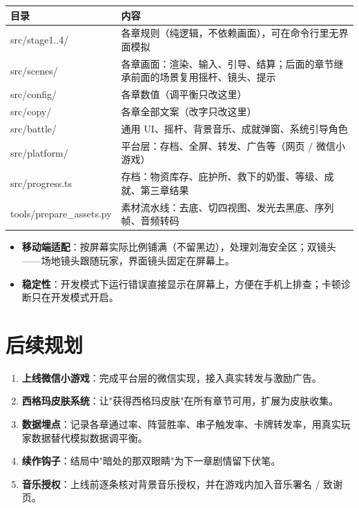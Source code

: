 \documentclass[11pt,a4paper]{ctexart}
\begin{document}
\begin{center}
\begin{tabularx}{\linewidth}{>{\ttfamily}l X}
\toprule
\normalfont 目录 & 内容 \\
\midrule
src/stage1..4/ & 各章规则（纯逻辑，不依赖画面），可在命令行里无界面模拟 \\
src/scenes/ & 各章画面：渲染、输入、引导、结算；后面的章节继承前面的场景复用摇杆、镜头、提示 \\
src/config/ & 各章数值（调平衡只改这里） \\
src/copy/ & 各章全部文案（改字只改这里） \\
src/battle/ & 通用 UI、摇杆、背景音乐、成就弹窗、系统引导角色 \\
src/platform/ & 平台层：存档、全屏、转发、广告等（网页 / 微信小游戏） \\
src/progress.ts & 存档：物资库存、庇护所、救下的奶蛋、等级、成就、第三章结果 \\
tools/prepare\_assets.py & 素材流水线：去底、切四视图、发光去黑底、序列帧、音频转码 \\
\bottomrule
\end{tabularx}
\end{center}

\begin{itemize}
  \item \textbf{移动端适配}：按屏幕实际比例铺满（不留黑边），处理刘海安全区；双镜头——场地镜头跟随玩家，界面镜头固定在屏幕上。
  \item \textbf{稳定性}：开发模式下运行错误直接显示在屏幕上，方便在手机上排查；卡顿诊断只在开发模式开启。
\end{itemize}

\section{后续规划}
\begin{enumerate}
  \item \textbf{上线微信小游戏}：完成平台层的微信实现，接入真实转发与激励广告。
  \item \textbf{西格玛皮肤系统}：让"获得西格玛皮肤"在所有章节可用，扩展为皮肤收集。
  \item \textbf{数据埋点}：记录各章通过率、阵营胜率、串子触发率、卡牌转发率，用真实玩家数据替代模拟数据调平衡。
  \item \textbf{续作钩子}：结局中"暗处的那双眼睛"为下一章剧情留下伏笔。
  \item \textbf{音乐授权}：上线前逐条核对背景音乐授权，并在游戏内加入音乐署名 / 致谢页。
\end{enumerate}
\end{document}
